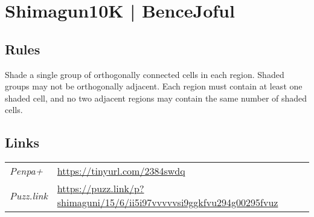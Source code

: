 \section[Shimagun10K | BenceJoful {[\emph{Shimaguni/Islands}]}]{Shimagun10K | {\normalfont BenceJoful}}
\label{sec:19-shimagun10k-bencejoful}

\subsection*{Rules}
\begin{markdown}
Shade a single group of orthogonally connected cells in each region. Shaded groups may not be orthogonally adjacent. Each region must contain at least one shaded cell, and no two adjacent regions may contain the same number of shaded cells.
\end{markdown}
\subsection*{Links}
\begin{tabularx}{\textwidth}{l X}
\emph{Penpa+} & \url{https://tinyurl.com/2384swdq } \\
\emph{Puzz.link} & \url{https://puzz.link/p?shimaguni/15/6/ii5i97vvvvvsi9ggkfvu294g00295fvuz} \\
\end{tabularx}
\pagebreak
